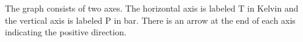 The graph consists of two axes. The horizontal axis is labeled T in Kelvin and the vertical axis is labeled P in bar. There is an arrow at the end of each axis indicating the positive direction.